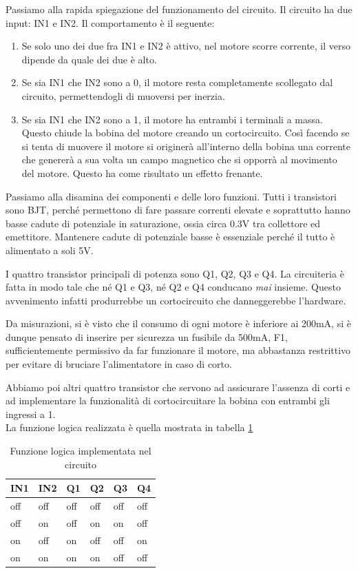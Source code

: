 \documentclass[12pt]{article}
\begin{document}
Passiamo alla rapida spiegazione del funzionamento del circuito. Il circuito ha due input: IN1 e IN2. Il comportamento è il seguente:
\begin{enumerate}
\item Se solo uno dei due fra IN1 e IN2 è attivo, nel motore scorre corrente, il verso dipende da quale dei due è alto.
\item Se sia IN1 che IN2 sono a 0, il motore resta completamente scollegato dal circuito, permettendogli di muoversi per inerzia.
\item Se sia IN1 che IN2 sono a 1, il motore ha entrambi i terminali a massa. Questo chiude la bobina del motore creando un cortocircuito. Così facendo se si tenta di muovere il motore si originerà all'interno della bobina una corrente che genererà a sua volta un campo magnetico che si opporrà al movimento del motore. Questo ha come risultato un effetto frenante. 
\end{enumerate}

Passiamo alla disamina dei componenti e delle loro funzioni.
Tutti i transistori sono BJT, perché permettono di fare passare correnti elevate e soprattutto hanno basse cadute di potenziale in saturazione, ossia circa 0.3V tra collettore ed emettitore. Mantenere cadute di potenziale basse è essenziale perché il tutto è alimentato a soli 5V.

I quattro transistor principali di potenza sono Q1, Q2, Q3 e Q4. La circuiteria è fatta in modo tale che né Q1 e Q3, né Q2 e Q4 conducano \emph{mai} insieme. Questo avvenimento infatti produrrebbe un cortocircuito che danneggerebbe l'hardware.

Da misurazioni, si è visto che il consumo di ogni motore è inferiore ai 200mA, si è dunque pensato di inserire per sicurezza un fusibile da 500mA, F1, sufficientemente permissivo da far funzionare il motore, ma abbastanza restrittivo per evitare di bruciare l'alimentatore in caso di corto.

Abbiamo poi altri quattro transistor che servono ad assicurare l'assenza di corti e ad implementare la funzionalità di cortocircuitare la bobina con entrambi gli ingressi a 1.\\
La funzione logica realizzata è quella mostrata in tabella \ref{tab:tabFunz}

\begin{table}[h]
\begin{center}


\begin{tabular}{l|l|l|l|l|l}

IN1 & IN2 & Q1 & Q2 & Q3 & Q4 \\
\hline
off & off & off & off & off & off \\
off & on & off & on & on &  off \\
on & off & on & off & off &  on \\
on & on & on & on & off & off


\end{tabular}

\end{center}
\caption{Funzione logica implementata nel circuito}
\label{tab:tabFunz}
\end{table}
\end{document}

